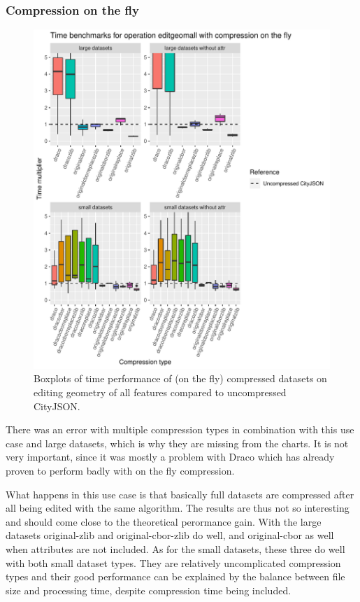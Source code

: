 \clearpage

\subsubsection{Compression on the fly}

\begin{figure}[h!]
    \includegraphics[scale=0.92]{figs/benchmark/individualotf/editgeomall.pdf}
    \caption{Boxplots of time performance of (on the fly) compressed datasets on editing geometry of all features compared to uncompressed CityJSON.}
    \label{figotf:sdvis}
\end{figure}

There was an error with multiple compression types in combination with this use case and large datasets, which is why they are missing from the charts.
It is not very important, since it was mostly a problem with Draco which has already proven to perform badly with on the fly compression.

What happens in this use case is that basically full datasets are compressed after all being edited with the same algorithm.
The results are thus not so interesting and should come close to the theoretical perormance gain.
With the large datasets original-zlib and original-cbor-zlib do well, and original-cbor as well when attributes are not included.
As for the small datasets, these three do well with both small dataset types.
They are relatively uncomplicated compression types and their good performance can be explained by the balance between file size and processing time, despite compression time being included.

